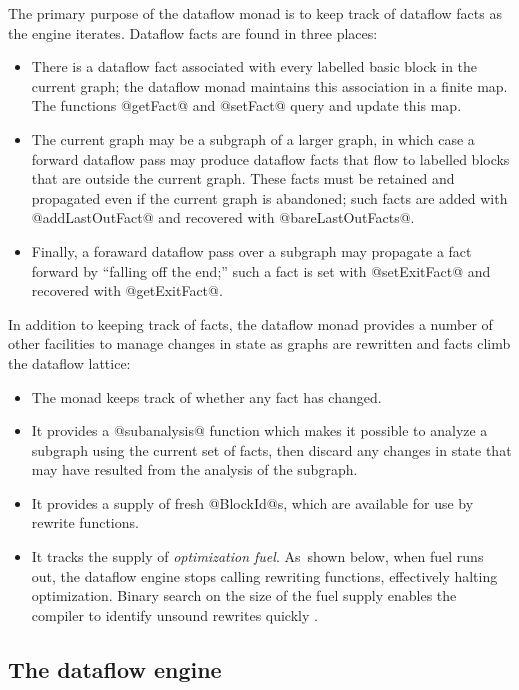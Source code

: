 \documentclass[blockstyle,preprint,nocopyrightspace]{sigplanconf}
\let\cite\citep
\begin{document}
The primary purpose of the dataflow monad is to keep track of 
dataflow facts as the engine iterates.
Dataflow facts are found in three places:
\begin{itemize}
\item
There is a dataflow fact associated with every labelled basic block in
the current graph;
the dataflow monad maintains this association in a finite map.
The functions @getFact@ and @setFact@ query and update this map.
\item
The current graph may be a subgraph of a larger graph, in which case a
forward dataflow pass may produce dataflow facts that flow to labelled
blocks that are outside the current graph.
These facts must be retained and propagated even if the current graph
is abandoned; such facts are added with @addLastOutFact@ and recovered
with @bareLastOutFacts@.
\item
Finally, a foraward dataflow pass over a subgraph may propagate a fact forward by
``falling off the end;'' such a fact is set with @setExitFact@ and
recovered with @getExitFact@.
\end{itemize}
In addition to keeping track of facts, 
the dataflow monad provides a number of other facilities to manage
changes in state as graphs are rewritten and facts climb the dataflow
lattice:
\begin{itemize}
\item
The monad keeps track of whether any fact has changed.
\item
It provides a @subanalysis@ function which makes it possible to
 analyze a subgraph using the current set of facts, then discard any
 changes in state that may have resulted from the analysis of the
 subgraph.
\item
It provides a supply of fresh @BlockId@s, which are available for use
by rewrite functions.
\item
It tracks the supply of \emph{optimization fuel}.
As~shown below, when fuel runs out, the dataflow engine stops
calling rewriting functions, effectively halting optimization.
Binary search on the size of the fuel supply enables the compiler to
identify unsound rewrites quickly \cite{whalley:isolation}.
\end{itemize}


\subsection{The dataflow engine}
\end{document}
